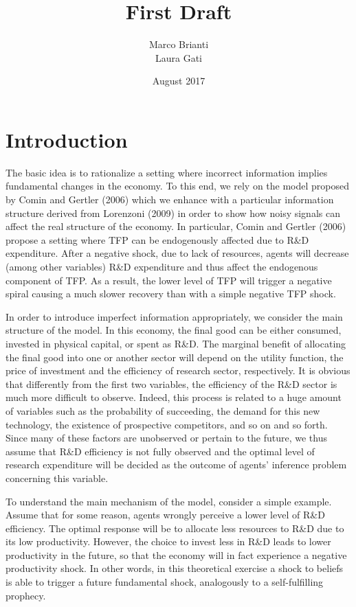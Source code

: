 \documentclass{article}
\title{First Draft}
\author{Marco Brianti\\Laura Gati}
\date{August 2017}
\begin{document}
	
	\maketitle
	
	\section{Introduction}
	
	The basic idea is to rationalize a setting where incorrect information implies fundamental changes in the economy. To this end, we rely on the model proposed by Comin and Gertler (2006) which we enhance with a particular information structure derived from Lorenzoni (2009) in order to show how noisy signals can affect the real structure of the economy. In particular, Comin and Gertler (2006) propose a setting where TFP can be endogenously affected due to R\&D expenditure. After a negative shock, due to lack of resources, agents will decrease (among other variables) R\&D expenditure and thus affect the endogenous component of TFP. As a result, the lower level of TFP will trigger a negative spiral causing a much slower recovery than with a simple negative TFP shock.
	
	In order to introduce imperfect information appropriately, we consider the main structure of the model. In this economy, the final good can be either consumed, invested in physical capital, or spent as R\&D. The marginal benefit of allocating the final good into one or another sector will depend on the utility function, the price of investment and the efficiency of research sector, respectively. It is obvious that differently from the first two variables, the efficiency of the R\&D sector is much more difficult to observe. Indeed, this process is related to a huge amount of variables such as the probability of succeeding, the demand for this new technology, the existence of prospective competitors, and so on and so forth. Since many of these factors are unobserved or pertain to the future, we thus assume that R\&D efficiency is not fully observed and the optimal level of research expenditure will be decided as the outcome of agents' inference problem concerning this variable.
	
	To understand the main mechanism of the model, consider a simple example. Assume that for some reason, agents wrongly perceive a lower level of R\&D efficiency. The optimal response will be to allocate less resources to R\&D due to its low productivity. However, the choice to invest less in R\&D leads to lower productivity in the future, so that the economy will in fact experience a negative productivity shock. In other words, in this theoretical exercise a shock to beliefs is able to trigger a future fundamental shock, analogously to a self-fulfilling prophecy.
	
\end{document}
